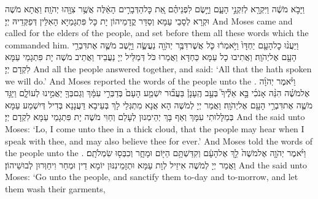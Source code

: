 {וַיָּבֹ֣א מֹשֶׁ֔ה וַיִּקְרָ֖א לְזִקְנֵ֣י הָעָ֑ם וַיָּ֣שֶׂם לִפְנֵיהֶ֗ם אֵ֚ת כׇּל\maqqaf הַדְּבָרִ֣ים הָאֵ֔לֶּה אֲשֶׁ֥ר צִוָּ֖הוּ יְהֹוָֽה׃}
{וַאֲתָא מֹשֶׁה וּקְרָא לְסָבֵי עַמָּא וְסַדַּר קֳדָמֵיהוֹן יָת כָּל פִּתְגָמַיָּא הָאִלֵּין דְּפַקְּדֵיהּ יְיָ׃}
{And Moses came and called for the elders of the people, and set before them all these words which the \lord\space commanded him.}{}
{וַיַּעֲנ֨וּ כׇל\maqqaf הָעָ֤ם יַחְדָּו֙ וַיֹּ֣אמְר֔וּ כֹּ֛ל אֲשֶׁר\maqqaf דִּבֶּ֥ר יְהֹוָ֖ה נַעֲשֶׂ֑ה וַיָּ֧שֶׁב מֹשֶׁ֛ה אֶת\maqqaf דִּבְרֵ֥י הָעָ֖ם אֶל\maqqaf יְהֹוָֽה׃}
{וַאֲתִיבוּ כָל עַמָּא כַּחְדָּא וַאֲמַרוּ כֹּל דְּמַלֵּיל יְיָ נַעֲבֵיד וַאֲתֵיב מֹשֶׁה יָת פִּתְגָמֵי עַמָּא לִקְדָם יְיָ׃}
{And all the people answered together, and said: ‘All that the \lord\space hath spoken we will do.’ And Moses reported the words of the people unto the \lord.}{}
{וַיֹּ֨אמֶר יְהֹוָ֜ה אֶל\maqqaf מֹשֶׁ֗ה הִנֵּ֨ה אָנֹכִ֜י בָּ֣א אֵלֶ֘יךָ֮ בְּעַ֣ב הֶֽעָנָן֒ בַּעֲב֞וּר יִשְׁמַ֤ע הָעָם֙ בְּדַבְּרִ֣י עִמָּ֔ךְ וְגַם\maqqaf בְּךָ֖ יַאֲמִ֣ינוּ לְעוֹלָ֑ם וַיַּגֵּ֥ד מֹשֶׁ֛ה אֶת\maqqaf דִּבְרֵ֥י הָעָ֖ם אֶל\maqqaf יְהֹוָֽה׃}
{וַאֲמַר יְיָ לְמֹשֶׁה הָא אֲנָא מִתְגְּלֵי לָךְ בְּעֵיבָא דַּעֲנָנָא בְּדִיל דְּיִשְׁמַע עַמָּא בְּמַלָּלוּתִי עִמָּךְ וְאַף בָּךְ יְהֵימְנוּן לְעָלַם וְחַוִּי מֹשֶׁה יָת פִּתְגָמֵי עַמָּא לִקְדָם יְיָ׃}
{And the \lord\space said unto Moses: ‘Lo, I come unto thee in a thick cloud, that the people may hear when I speak with thee, and may also believe thee for ever.’ And Moses told the words of the people unto the \lord.}{}
{וַיֹּ֨אמֶר יְהֹוָ֤ה אֶל\maqqaf מֹשֶׁה֙ לֵ֣ךְ אֶל\maqqaf הָעָ֔ם וְקִדַּשְׁתָּ֥ם הַיּ֖וֹם וּמָחָ֑ר וְכִבְּס֖וּ שִׂמְלֹתָֽם׃}
{וַאֲמַר יְיָ לְמֹשֶׁה אִיזֵיל לְוָת עַמָּא וּתְזָמֵינִנּוּן יוֹמָא דֵין וּמְחַר וִיחַוְּרוּן לְבוּשֵׁיהוֹן׃}
{And the \lord\space said unto Moses: ‘Go unto the people, and sanctify them to-day and to-morrow, and let them wash their garments,}{}
